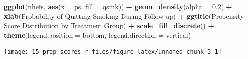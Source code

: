 \documentclass[
  10pt,
]{book}
\newenvironment{Shaded}{\begin{snugshade}}{\end{snugshade}}
\newcommand{\DataTypeTok}[1]{\textcolor[rgb]{0.13,0.29,0.53}{#1}}
\newcommand{\FloatTok}[1]{\textcolor[rgb]{0.00,0.00,0.81}{#1}}
\newcommand{\KeywordTok}[1]{\textcolor[rgb]{0.13,0.29,0.53}{\textbf{#1}}}
\newcommand{\NormalTok}[1]{#1}
\newcommand{\OperatorTok}[1]{\textcolor[rgb]{0.81,0.36,0.00}{\textbf{#1}}}
\newcommand{\StringTok}[1]{\textcolor[rgb]{0.31,0.60,0.02}{#1}}
\begin{document}
\begin{Shaded}
\begin{Highlighting}[]
\KeywordTok{ggplot}\NormalTok{(nhefs, }\KeywordTok{aes}\NormalTok{(}\DataTypeTok{x =}\NormalTok{ ps, }\DataTypeTok{fill =}\NormalTok{ qsmk)) }\OperatorTok{+}\StringTok{ }\KeywordTok{geom\_density}\NormalTok{(}\DataTypeTok{alpha =} \FloatTok{0.2}\NormalTok{) }\OperatorTok{+}
\StringTok{  }\KeywordTok{xlab}\NormalTok{(}\StringTok{\textquotesingle{}Probability of Quitting Smoking During Follow{-}up\textquotesingle{}}\NormalTok{) }\OperatorTok{+}
\StringTok{  }\KeywordTok{ggtitle}\NormalTok{(}\StringTok{\textquotesingle{}Propensity Score Distribution by Treatment Group\textquotesingle{}}\NormalTok{) }\OperatorTok{+}
\StringTok{  }\KeywordTok{scale\_fill\_discrete}\NormalTok{(}\StringTok{\textquotesingle{}\textquotesingle{}}\NormalTok{) }\OperatorTok{+}
\StringTok{  }\KeywordTok{theme}\NormalTok{(}\DataTypeTok{legend.position =} \StringTok{\textquotesingle{}bottom\textquotesingle{}}\NormalTok{, }\DataTypeTok{legend.direction =} \StringTok{\textquotesingle{}vertical\textquotesingle{}}\NormalTok{)}
\end{Highlighting}
\end{Shaded}

\begin{center}\texttt{[image: 15-prop-scores-r\_files/figure-latex/unnamed-chunk-3-1]} \end{center}
\end{document}
